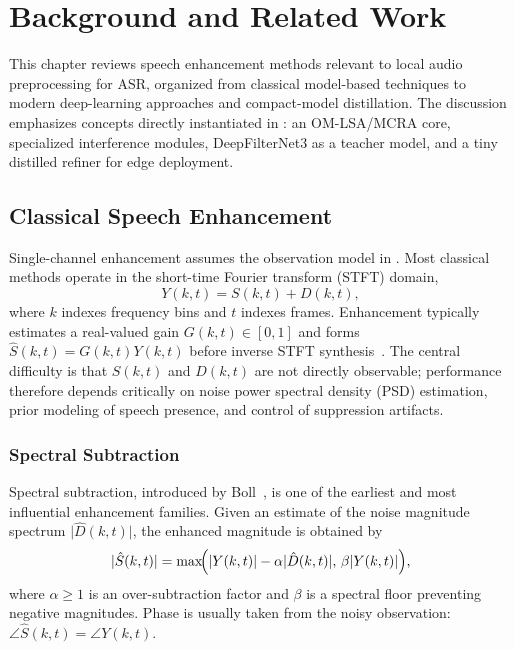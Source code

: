\chapter{Background and Related Work}
\label{ch:background}

This chapter reviews speech enhancement methods relevant to local audio preprocessing for ASR, organized from classical model-based techniques to modern deep-learning approaches and compact-model distillation. The discussion emphasizes concepts directly instantiated in \projectshort{}: an OM-LSA/MCRA core, specialized interference modules, DeepFilterNet3 as a teacher model, and a tiny distilled refiner for edge deployment.

\section{Classical Speech Enhancement}
\label{sec:classical}

Single-channel enhancement assumes the observation model in . Most classical methods operate in the short-time Fourier transform (STFT) domain,
\begin{equation}
  Y(k,t) = S(k,t) + D(k,t),
\end{equation}
where $k$ indexes frequency bins and $t$ indexes frames. Enhancement typically estimates a real-valued gain $G(k,t) \in [0,1]$ and forms $\hat{S}(k,t)=G(k,t)Y(k,t)$ before inverse STFT synthesis~\cite{loizou2013}. The central difficulty is that $S(k,t)$ and $D(k,t)$ are not directly observable; performance therefore depends critically on noise power spectral density (PSD) estimation, prior modeling of speech presence, and control of suppression artifacts.

\subsection{Spectral Subtraction}
\label{sec:spectral_subtraction}

Spectral subtraction, introduced by Boll~\cite{boll1979}, is one of the earliest and most influential enhancement families. Given an estimate of the noise magnitude spectrum $\lvert \hat{D}(k,t)\rvert$, the enhanced magnitude is obtained by
\begin{equation}
  \lvert \hat{S}(k,t)\rvert =
  \max\!\Bigl(\lvert Y(k,t)\rvert - \alpha \lvert \hat{D}(k,t)\rvert,\,\beta \lvert Y(k,t)\rvert\Bigr),
  \label{eq:spec_sub}
\end{equation}
where $\alpha \ge 1$ is an over-subtraction factor and $\beta$ is a spectral floor preventing negative magnitudes. Phase is usually taken from the noisy observation: $\angle\hat{S}(k,t)=\angle Y(k,t)$.

